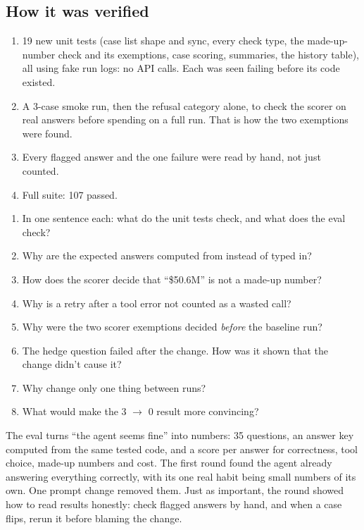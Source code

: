 \documentclass[11pt]{article}
\newcommand{\code}[1]{\texttt{\detokenize{#1}}}
\begin{document}
\subsection{How it was verified}

\begin{enumerate}
  \item 19 new unit tests (case list shape and sync, every check type, the made-up-number
        check and its exemptions, case scoring, summaries, the history table), all using fake
        run logs: no API calls. Each was seen failing before its code existed.
  \item A 3-case smoke run, then the refusal category alone, to check the scorer on real
        answers before spending on a full run. That is how the two exemptions were found.
  \item Every flagged answer and the one failure were read by hand, not just counted.
  \item Full suite: 107 passed.
\end{enumerate}

\begin{reviewq}
\begin{enumerate}
  \item In one sentence each: what do the unit tests check, and what does the eval check?
  \item Why are the expected answers computed from \code{analytics.py} instead of typed in?
  \item How does the scorer decide that ``\$50.6M'' is not a made-up number?
  \item Why is a retry after a tool error not counted as a wasted call?
  \item Why were the two scorer exemptions decided \emph{before} the baseline run?
  \item The hedge question failed after the change. How was it shown that the change didn't
        cause it?
  \item Why change only one thing between runs?
  \item What would make the 3 $\to$ 0 result more convincing?
\end{enumerate}
\end{reviewq}

\begin{takeaway}
The eval turns ``the agent seems fine'' into numbers: 35 questions, an answer key computed from
the same tested code, and a score per answer for correctness, tool choice, made-up numbers and
cost. The first round found the agent already answering everything correctly, with its one real
habit being small numbers of its own. One prompt change removed them. Just as important, the
round showed how to read results honestly: check flagged answers by hand, and when a case flips,
rerun it before blaming the change.
\end{takeaway}
\end{document}
